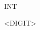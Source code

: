 \documentclass[convert={outext=.png}]{standalone}
\begin{document}
\begin{málrit}{INT}
	\begin{rep}
		<DIGIT>
	\end{rep}
\end{málrit}
\end{document}
